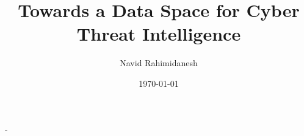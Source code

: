 \begin{titlingpage}
	\newlength{\logoheight}	\setlength{\logoheight}{5cm}
	\setlength{\droptitle}{-3em}
	
	\renewcommand{\maketitlehooka}{%
		\begin{center}
			{\Large  Rheinisch-Westfälische Technische Hochschule Aachen\par\noindent}
			 Informatik 5, Information Systems\\
			Prof. Dr. Stefan Decker\\
			\vspace*{2cm}
			{\LARGE\scshape Master Thesis}
			\vspace*{1.5em}
		\end{center}
	}
	\pretitle{\begin{center}\bfseries\HUGE\color{rwth-75}}
				\title{Towards a Data Space for Cyber Threat Intelligence}
	\posttitle{\end{center}\vskip 4em}
	
	\preauthor{\begin{center}\Large}
		\author{Navid Rahimidanesh}
	\postauthor{\end{center}\vskip 2em}
	
	\predate{\begin{center}\Large}
	\date{\today} %
	\postdate{\end{center}\vskip 2em}

    \renewcommand{\maketitlehookd}{%
    	\vfill
    \centerfloat
    \begin{tabular}{>{\sffamily\color{rwth}}r>{}l}
		\nth{1} Advisor			 &  Mehdi Akbari Gurabi, M.Sc.\\ %
		\nth{2} Advisor			 &  Ömer Sen, M.Sc.\\ %
    	\nth{1} Supervisor		& Prof. Dr. Stefan Decker \\%
    	\nth{2} Supervisor 		& Prof. Dr.-Ing  Ulrike Meyer \\ %
    	
    \end{tabular}
	}
	\calccentering{\unitlength}
	\begin{adjustwidth*}{\unitlength}{-\unitlength}
		\maketitle
	\end{adjustwidth*}
\end{titlingpage}
